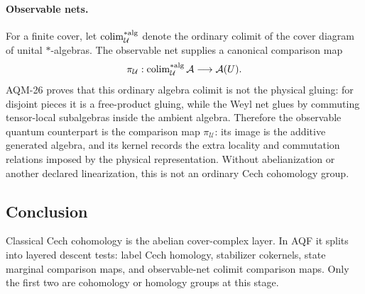 \paragraph{Observable nets.}
For a finite cover, let \(\operatorname{colim}_{\mathcal U}^{*{\rm alg}}\)
denote the ordinary colimit of the cover diagram of unital \(*\)-algebras.
The observable net supplies a canonical comparison map
\[
  \pi_{\mathcal U}:
  \operatorname{colim}_{\mathcal U}^{*{\rm alg}}\mathcal A
  \longrightarrow
  \mathcal A(U).
\]
AQM-26 proves that this ordinary algebra colimit is not the physical gluing:
for disjoint pieces it is a free-product gluing, while the Weyl net glues by
commuting tensor-local subalgebras inside the ambient algebra.  Therefore the
observable quantum counterpart is the comparison map \(\pi_{\mathcal U}\):
its image is the additive generated algebra, and its kernel records the extra
locality and commutation relations imposed by the physical representation.
Without abelianization or another declared linearization, this is not an
ordinary Cech cohomology group.

\subsection{Conclusion}

Classical Cech cohomology is the abelian cover-complex layer.  In AQF it
splits into layered descent tests: label Cech homology, stabilizer cokernels,
state marginal comparison maps, and observable-net colimit comparison maps.
Only the first two are cohomology or homology groups at this stage.
